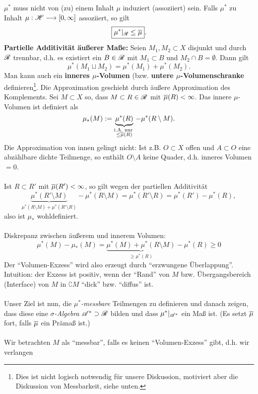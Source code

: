 $\mu^*$ muss nicht von (zu) einem Inhalt $\mu$ induziert (assoziiert) sein. Falls $\mu^*$ zu Inhalt $\mu:\HH\longrightarrow [0,\infty]$ assoziiert, so gilt %
\begin{equation*}
\boxed{\mu^*|_{\RR} \leq \ol{\mu}}.
\end{equation*}
\textbf{Partielle Additivität äußerer Maße:}  Seien $M_1,M_2\subset X$ disjunkt und durch $\RR$ trennbar, d.h. es existiert ein $B\in \RR$ mit $M_1\subset B$ und $M_2 \cap B = \emptyset$. Dann gilt\Ueb $$\mu^*(M_1\sqcup M_2)=\mu^*(M_1) + \mu^*(M_2).$$
Man kann auch ein \textbf{inneres $\mu$-Volumen} (bzw. \textbf{untere $\mu$-Volumenschranke} definieren\footnote{Dies ist nicht logisch notwendig für unsere Diskussion, motiviert aber die Diskussion von Messbarkeit, siehe unten.}. Die Approximation geschieht durch äußere Approximation des Komplements. Sei $M\subset X$ so, dass $M \subset R\in \RR$ mit $\ol\mu(R)<\infty$. Das innere $\mu$-Volumen ist definiert als
$$
\mu_*(M):= \underbrace{\mu^*(R)}_{\substack{\text{i.A. nur }\\\leq \ol\mu(R)}}-\mu^*(R\setminus M).
$$
Die Approximation von innen gelingt nicht: Ist z.B. $O\subset X$ offen und $A\subset O$ eine abzählbare dichte Teilmenge, so enthält $O\setminus A$ keine Quader, d.h. inneres Volumen $=0$.\\\\
Ist $R \subset R'$ mit $\ol\mu(R')<\infty$, so gilt wegen der partiellen Additivität
$$
\underbrace{\mu^*(R'\setminus M)}_{\mu^*(R\setminus M) + \mu^*(R'\setminus R)}-\mu^*(R\setminus M)=\mu^*(R'\setminus R) = \mu^*(R')-\mu^*(R),
$$
also ist $\mu_*$ wohldefiniert. \\\\
Diskrepanz zwischen äußerem und innerem Volumen:
$$
\mu^*(M)-\mu_*(M)=\underbrace{\mu^*(M)+\mu^*(R\setminus M)}_{\geq \mu^*(R)} - \mu^*(R)\geq 0
$$
Der ``Volumen-Exzess'' wird also erzeugt durch ``erzwungene Überlappung''. Intuition: der Exzess ist positiv, wenn der ``Rand'' von $M$ bzw. Übergangsbereich (Interface) von $M$ in $\complement M$ ``dick'' bzw. ``diffus'' ist.\\\\
Unser Ziel ist nun, die \emph{$\mu^*$-messbare} Teilmengen zu definieren und danach zeigen, dass diese eine \emph{$\sigma$-Algebra} $\AA^*\supset \RR$ bilden und dass $\mu^*|_{\AA^*}$ ein Maß ist. (Es setzt $\ol{\mu}$ fort, falls $\ol\mu$ ein Prämaß ist.)
\\\\
Wir betrachten $M$ als ``messbar'', falls es keinen ``Volumen-Exzess'' gibt, d.h. wir verlangen
